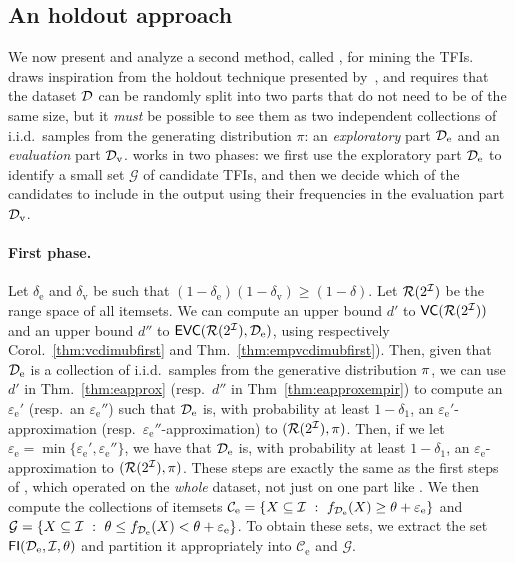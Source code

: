 \subsection{An holdout approach}\label{sec:holdout}

We now present and analyze a second method, called \ALGHOLDOUT, for
mining the TFIs. \ALGHOLDOUT draws inspiration from the holdout technique
presented by~\citet{Webb07}, and requires that the dataset ${\cal D}$ can be
randomly split into two parts that do not need to be of the same size, but
it \emph{must} be possible to see them as two independent collections of
i.i.d.~samples from the generating distribution $\pi$: an \emph{exploratory}
part ${\cal D}_\mathrm{e}$ and an \emph{evaluation} part ${\cal D}_\mathrm{v}$.
\ALGHOLDOUT works in two phases: we first use the exploratory part
${\cal D}_\mathrm{e}$ to identify a small set $\mathcal{G}$ of candidate TFIs, and
then we decide which of the candidates to include in the output using their
frequencies in the evaluation part ${\cal D}_\mathrm{v}$.

\paragraph{First phase.} Let $\delta_\mathrm{e}$ and $\delta_\mathrm{v}$ be such
that $(1-\delta_\mathrm{e})(1-\delta_\mathrm{v})\ge(1-\delta)$. Let
$\mathcal{R}(2^{\cal I})$ be the range space of all itemsets. We can compute an upper
bound $d'$ to $\mathsf{VC}(\mathcal{R}(2^{\cal I}))$ and an upper bound $d''$ to
$\mathsf{EVC}(\mathcal{R}(2^{\cal I}),{\cal D}_\mathrm{e})$, using respectively
Corol.~\ref{thm:vcdimubfirst} and Thm.~\ref{thm:empvcdimubfirst}). Then, given
that ${\cal D}_\mathrm{e}$ is a collection of i.i.d.~samples from the generative
distribution $\pi$, we can use $d'$ in Thm.~\ref{thm:eapprox} (resp.~$d''$ in
Thm~\ref{thm:eapproxempir}) to compute an $\varepsilon_\mathrm{e}'$ (resp.~an
$\varepsilon_\mathrm{e}''$) such that ${\cal D}_\mathrm{e}$ is, with probability at
least $1-\delta_1$, an $\varepsilon_\mathrm{e}'$-approximation
(resp.~$\varepsilon_\mathrm{e}''$-approximation) to $(\mathcal{R}(2^{\cal I}),\pi)$.
Then, if we let
$\varepsilon_\mathrm{e}=\min\{\varepsilon_\mathrm{e}',\varepsilon_\mathrm{e}''\}$,
we have that ${\cal D}_\mathrm{e}$ is, with probability at least $1-\delta_1$, an
$\varepsilon_\mathrm{e}$-approximation to $(\mathcal{R}(2^{\cal I}),\pi)$. These steps
are exactly the same as the first steps of \ALG, which operated on the
\emph{whole} dataset, not just on one part like \ALGHOLDOUT. We then compute the
collections of itemsets $\mathcal{C}_\mathrm{e}=\{X\subseteq{\cal I} ~:~
f_{{\cal D}_\mathrm{e}}(X)\ge\theta+\varepsilon_\mathrm{e}\}$ and
$\mathcal{G}=\{X\subseteq{\cal I} ~:~ \theta\le
f_{{\cal D}_\mathrm{e}}(X)<\theta+\varepsilon_\mathrm{e}\}$. To obtain these sets, we
extract the set $\mathsf{FI}({\cal D}_\mathrm{e},{\cal I},\theta)$ and partition it appropriately
into $\mathcal{C}_\mathrm{e}$ and $\mathcal{G}$.

